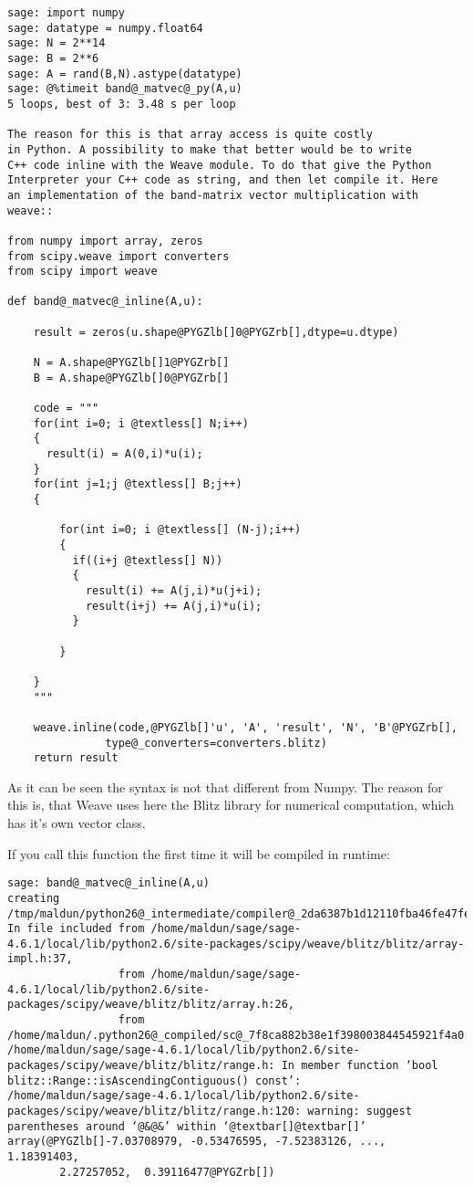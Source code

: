 \documentclass[letterpaper,10pt,english]{manual}
\begin{document}
\begin{Verbatim}[commandchars=@\[\]]
sage: import numpy
sage: datatype = numpy.float64
sage: N = 2**14
sage: B = 2**6
sage: A = rand(B,N).astype(datatype)
sage: @%timeit band@_matvec@_py(A,u)
5 loops, best of 3: 3.48 s per loop

The reason for this is that array access is quite costly
in Python. A possibility to make that better would be to write
C++ code inline with the Weave module. To do that give the Python
Interpreter your C++ code as string, and then let compile it. Here
an implementation of the band-matrix vector multiplication with weave::

from numpy import array, zeros
from scipy.weave import converters
from scipy import weave

def band@_matvec@_inline(A,u):

    result = zeros(u.shape@PYGZlb[]0@PYGZrb[],dtype=u.dtype)

    N = A.shape@PYGZlb[]1@PYGZrb[]
    B = A.shape@PYGZlb[]0@PYGZrb[]

    code = """
    for(int i=0; i @textless[] N;i++)
    {
      result(i) = A(0,i)*u(i);
    }
    for(int j=1;j @textless[] B;j++)
    {

        for(int i=0; i @textless[] (N-j);i++)
        {
          if((i+j @textless[] N))
          {
            result(i) += A(j,i)*u(j+i);
            result(i+j) += A(j,i)*u(i);
          }

        }

    }
    """

    weave.inline(code,@PYGZlb[]'u', 'A', 'result', 'N', 'B'@PYGZrb[],
               type@_converters=converters.blitz)
    return result
\end{Verbatim}

As it can be seen the syntax is not that different from Numpy. The
reason for this is, that Weave uses here the Blitz library for
numerical computation, which has it's own vector class.

If you call this function the first time it will be compiled in
runtime:

\begin{Verbatim}[commandchars=@\[\]]
sage: band@_matvec@_inline(A,u)
creating /tmp/maldun/python26@_intermediate/compiler@_2da6387b1d12110fba46fe47fea9326a
In file included from /home/maldun/sage/sage-4.6.1/local/lib/python2.6/site-packages/scipy/weave/blitz/blitz/array-impl.h:37,
                 from /home/maldun/sage/sage-4.6.1/local/lib/python2.6/site-packages/scipy/weave/blitz/blitz/array.h:26,
                 from /home/maldun/.python26@_compiled/sc@_7f8ca882b38e1f398003844545921f4a0.cpp:11:
/home/maldun/sage/sage-4.6.1/local/lib/python2.6/site-packages/scipy/weave/blitz/blitz/range.h: In member function ‘bool blitz::Range::isAscendingContiguous() const’:
/home/maldun/sage/sage-4.6.1/local/lib/python2.6/site-packages/scipy/weave/blitz/blitz/range.h:120: warning: suggest parentheses around ‘@&@&’ within ‘@textbar[]@textbar[]’
array(@PYGZlb[]-7.03708979, -0.53476595, -7.52383126, ...,  1.18391403,
        2.27257052,  0.39116477@PYGZrb[])
\end{Verbatim}
\end{document}
